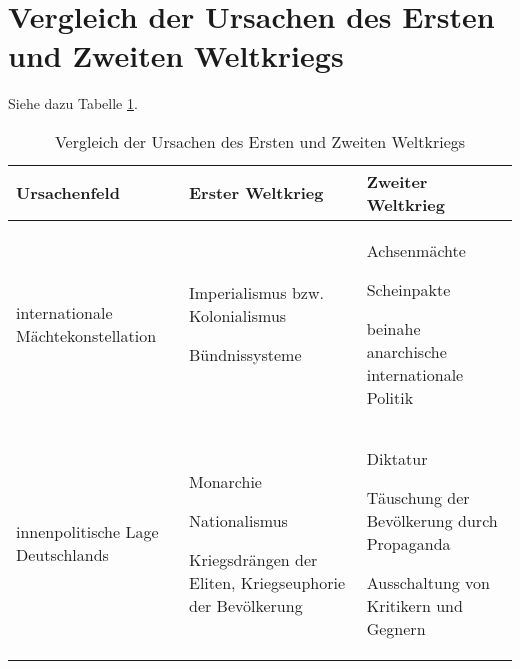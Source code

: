 \section{Vergleich der Ursachen des Ersten und Zweiten Weltkriegs}
Siehe dazu Tabelle \ref{tab:vergl-urs-12wk}.

\begin{table}
\caption{Vergleich der Ursachen des Ersten und Zweiten Weltkriegs}
\label{tab:vergl-urs-12wk}
\footnotesize

\settowidth{\frstcolwdth}{internationale Mäch-}

\begin{tabularx}{\textwidth}{p{\frstcolwdth}XX}
\toprule
Ursachenfeld & Erster Weltkrieg & Zweiter Weltkrieg \\
\midrule

internationale Mächtekonstellation &
\vspace{-0.74em}
\begin{tablist}
\item Imperialismus bzw. Kolonialismus
\item Bündnissysteme
\end{tablist}
&
\vspace{-0.74em}
\begin{tablist}
\item Achsenmächte
\item Scheinpakte
\item beinahe anarchische internationale Politik
\end{tablist}
\\

innenpolitische Lage Deutschlands &
\vspace{-0.74em}
\begin{tablist}
\item Monarchie
\item Nationalismus
\item Kriegsdrängen der Eliten, Kriegseuphorie der Bevölkerung 
\end{tablist}
&
\vspace{-0.74em}
\begin{tablist}
\item Diktatur
\item Täuschung der Bevölkerung durch Propaganda
\item Ausschaltung von Kritikern und Gegnern 
\end{tablist}
\\


\end{tabularx}
\end{table}
